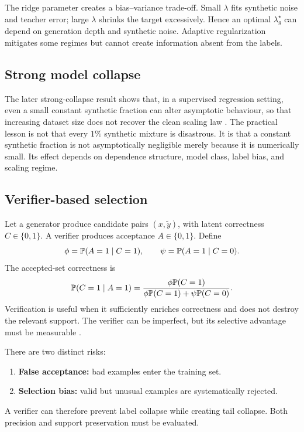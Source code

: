 The ridge parameter creates a bias--variance trade-off. Small $\lambda$ fits synthetic noise and teacher error; large $\lambda$ shrinks the target excessively. Hence an optimal $\lambda_g^\star$ can depend on generation depth and synthetic noise. Adaptive regularization mitigates some regimes but cannot create information absent from the labels.

\subsection{Strong model collapse}

The later strong-collapse result shows that, in a supervised regression setting, even a small constant synthetic fraction can alter asymptotic behaviour, so that increasing dataset size does not recover the clean scaling law \citep{dohmatob2025strong}. The practical lesson is not that every $1\%$ synthetic mixture is disastrous. It is that a constant synthetic fraction is not asymptotically negligible merely because it is numerically small. Its effect depends on dependence structure, model class, label bias, and scaling regime.

\subsection{Verifier-based selection}

Let a generator produce candidate pairs $(x,\widetilde y)$, with latent correctness $C\in\{0,1\}$. A verifier produces acceptance $A\in\{0,1\}$. Define
\[
\phi=\mathbb{P}(A=1\mid C=1),
\qquad
\psi=\mathbb{P}(A=1\mid C=0).
\]
The accepted-set correctness is
\[
\mathbb{P}(C=1\mid A=1)
=\frac{\phi\mathbb{P}(C=1)}{
\phi\mathbb{P}(C=1)+\psi\mathbb{P}(C=0)}.
\]
Verification is useful when it sufficiently enriches correctness and does not destroy the relevant support. The verifier can be imperfect, but its selective advantage must be measurable \citep{feng2025verification}.

There are two distinct risks:

\begin{enumerate}[leftmargin=*]
  \item \textbf{False acceptance:} bad examples enter the training set.
  \item \textbf{Selection bias:} valid but unusual examples are systematically rejected.
\end{enumerate}

A verifier can therefore prevent label collapse while creating tail collapse. Both precision and support preservation must be evaluated.

